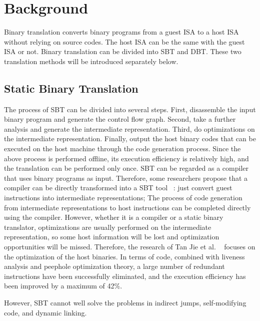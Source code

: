 \section{Background}
\label{sec:background}

Binary translation converts binary programs from a guest ISA to a host ISA without relying on source codes.
The host ISA can be the same with the guest ISA or not.
Binary translation can be divided into SBT and DBT. 
These two translation methods will be introduced separately below.

\subsection{Static Binary Translation}
The process of SBT can be divided into several steps.
First, disassemble the input binary program and generate the control flow graph.
Second, take a further analysis and generate the intermediate representation.
Third, do optimizations on the intermediate representation.
Finally, output the host binary codes that can be executed on the host machine through the code generation process.
Since the above process is performed offline, its execution efficiency is relatively high, and the translation can be performed only once.
SBT can be regarded as a compiler that uses binary programs as input.
Therefore, some researchers propose that a compiler can be directly transformed into a SBT tool ~\cite{Hwang2010DisIRerCA}: just convert guest instructions into intermediate representations; The process of code generation from intermediate representations to host instructions can be completed directly using the compiler. 
However, whether it is a compiler or a static binary translator, optimizations are usually performed on the intermediate representation, so some host information will be lost and optimization opportunities will be missed. 
Therefore, the research of Tan Jie et al. ~\cite{TanJie2017ISSN} focuses on the optimization of the host binaries. 
In terms of code, combined with liveness analysis and peephole optimization theory, a large number of redundant instructions have been successfully eliminated, and the execution efficiency has been improved by a maximum of 42\%.

However, SBT cannot well solve the problems in indirect jumps, self-modifying code, and dynamic linking.

